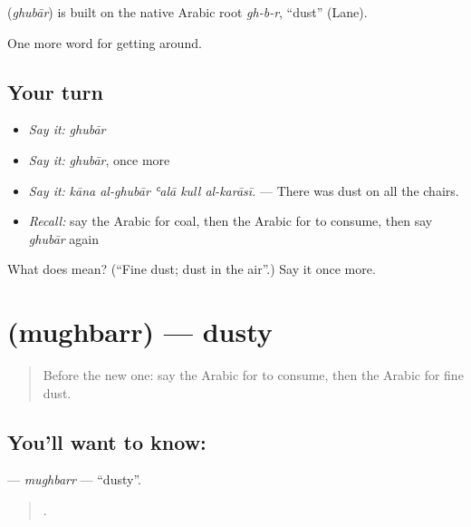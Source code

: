 \begin{cousinweb}
\textbf{} (\emph{ghubār}) is built on the native Arabic root \emph{gh-b-r}, \textquotedblleft{}dust\textquotedblright{} (Lane).
\end{cousinweb}

\begin{grammarlens}[title={What you've built}]
One more word for getting around.
\end{grammarlens}

\subsection*{Your turn}
\begin{itemize}
\raggedright
  \item \emph{Say it:} \emph{ghubār}
  \item \emph{Say it:} \emph{ghubār}, once more
  \item \emph{Say it:} \emph{kāna al-ghubār ʿalā kull al-karāsī.} — There was dust on all the chairs.
  \item \emph{Recall:} say the Arabic for coal, then the Arabic for to consume, then say \emph{ghubār} again
\end{itemize}

\begin{tcolorbox}[breakable,colback=teal!4,colframe=teal!35!black,title={Before you move on}]
What does  mean? (\textquotedblleft{}Fine dust; dust in the air\textquotedblright{}.) Say it once more.
\end{tcolorbox}
\section[\texorpdfstring{\ar{مغبر} (mughbarr)}{مغبر (mughbarr)}]{ (mughbarr) — dusty}

\label{lesson:AR-C466-mughbarr}



\begin{quote}
Before the new one: say the Arabic for to consume, then the Arabic for fine dust.
\end{quote}

\subsection*{You'll want to know: }
\textbf{} — \emph{mughbarr} — \textquotedblleft{}dusty\textquotedblright{}.

\begin{quote}
    .
\end{quote}

